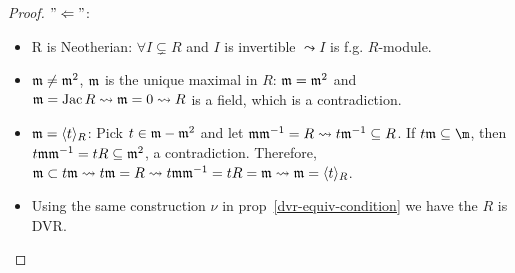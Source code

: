 \begin{prop}
\begin{enumerate}
\begin{proof}
        $"\Leftarrow"$: \mbox{}
        \begin{itemize}
          \item R is Neotherian:
            $\forall I \subsetneq R$ and $I$ is invertible $\leadsto I$ is f.g.
            $R$-module.
          \item $\mathfrak{m} \neq \mathfrak{m}^2$, $\mathfrak{m}$ is the unique maximal in $R$:
            $\mathfrak{m} = \mathfrak{m}^2$ and $\mathfrak{m} = \operatorname{Jac} R \leadsto \mathfrak{m} = 0 \leadsto R$ is a field,
             which is a contradiction.
          \item $\mathfrak{m} = \langle t\rangle_R$:
            Pick $t \in \mathfrak{m} - \mathfrak{m}^2$ and let $\mathfrak{m}\mathfrak{m}^{-1} = R \leadsto t\mathfrak{m}^{-1}
            \subseteq R$. If $t\mf \subseteq \m$, then $t\mathfrak{m}\mathfrak{m}^{-1} = tR \subseteq
            \mathfrak{m}^{2}$, a contradiction. Therefore, $\mathfrak{m} \subset t\mathfrak{m} \leadsto t\mathfrak{m} 
            = R \leadsto t\mathfrak{m}\mathfrak{m}^{-1} = tR = \mathfrak{m} \leadsto \mathfrak{m} = \langle t\rangle_R$. 
          \item Using the same construction $\nu$ in prop~\ref{dvr-equiv-condition}
            we have the $R$ is DVR.
            \qedhere
        \end{itemize}
      \end{proof}
  \end{enumerate}
\end{prop}

